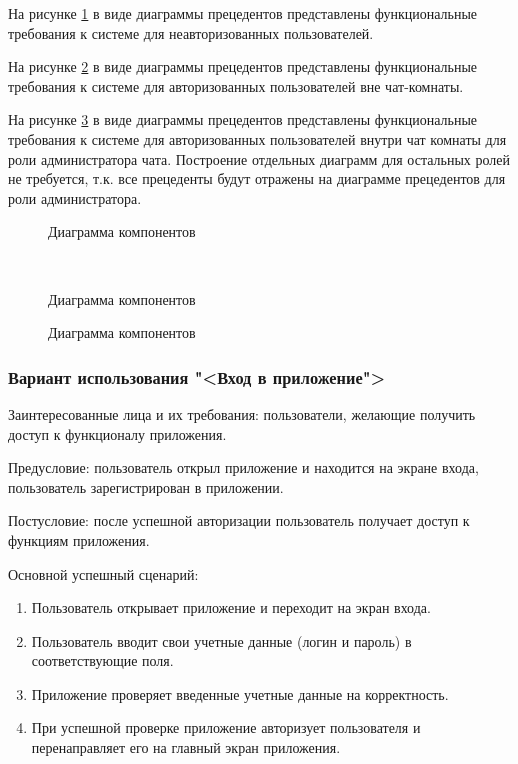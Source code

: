 На рисунке \ref{unauth:image} в виде диаграммы прецедентов представлены функциональные требования к системе для неавторизованных пользователей.

На рисунке \ref{auth:image} в виде диаграммы прецедентов представлены функциональные требования к системе для авторизованных пользователей вне чат-комнаты.

На рисунке \ref{admin:image} в виде диаграммы прецедентов представлены функциональные требования к системе для авторизованных пользователей внутри чат комнаты для роли администратора чата. Построение отдельных диаграмм для остальных ролей не требуется, т.к. все прецеденты будут отражены на диаграмме прецедентов для роли администратора.

\begin{figure}[ht]
	\caption{Диаграмма компонентов}
	\label{unauth:image}
\end{figure}
\ \\
\begin{figure}[ht]
	\caption{Диаграмма компонентов}
	\label{auth:image}
\end{figure}

\begin{figure}[H]
	\caption{Диаграмма компонентов}
	\label{admin:image}
\end{figure}

\subsubsection{Вариант использования "<Вход в приложение">}

Заинтересованные лица и их требования: пользователи, желающие получить доступ к функционалу приложения.

Предусловие: пользователь открыл приложение и находится на экране входа, пользователь зарегистрирован в приложении.

Постусловие: после успешной авторизации пользователь получает доступ к функциям приложения.

Основной успешный сценарий:
\begin{enumerate}
	\item Пользователь открывает приложение и переходит на экран входа.
	\item Пользователь вводит свои учетные данные (логин и пароль) в соответствующие поля.
	\item Приложение проверяет введенные учетные данные на корректность.
	\item При успешной проверке приложение авторизует пользователя и перенаправляет его на главный экран приложения.
\end{enumerate}

